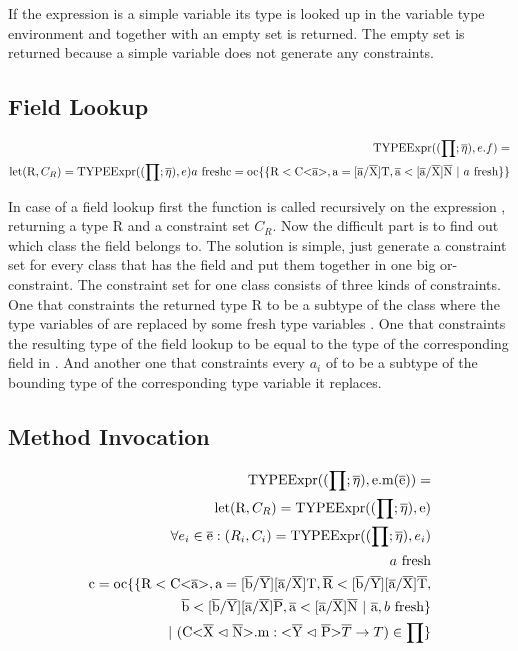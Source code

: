 If the expression is a simple variable its type is looked up in the variable type environment and together with an empty set is returned. The empty set is returned because a simple variable does not generate any constraints.

\subsection{Field Lookup}

\begin{align*}
    \texpr{e.f} = \\
    \text{let} ( \text{R}, C_R ) = \texpr{e}
    \fresh{a}
    \text{c} = \text{oc} \{ \{ \text{R} < \text{C<} \ot{a} \text{>}, \text{a} = \tsxsn{a}{X}{T}, \ot{a} < \tsxsns{a}{X}{N} \ | \ \fresh{a} \} \}\\
\end{align*}

In case of a field lookup  first the  function is called recursively on the expression , returning a
type R and a constraint set $C_R$. Now the difficult part is to find out which class the field  belongs to. The solution is simple,
just generate a constraint set for every class  that has the field  and put them together in one big or-constraint.
The constraint set for one class consists of three kinds of constraints. One that constraints the returned type R to be a subtype
of the class  where the type variables of  are replaced by some fresh type variables . One that constraints the resulting type of the field lookup
to be equal to the type of the corresponding field in . And another one that constraints every $a_i$ of  to be a subtype of the bounding type of the corresponding type variable it replaces.

\subsection{Method Invocation}

\begin{align*}
    \texpr{\text{e.m}( \ot{e} )} = \\
    \text{let} ( \text{R}, C_R ) = \texpr{\text{e}} \\
    \forall{e_i} \in \ot{e} : ( R_i, C_i ) = \texpr{e_i} \\
    \fresh{a} \\
    \text{c} = \text{oc} \{ \{ \text{R} < \text{C<} \ot{a} \text{>}, \text{a} = \tsxsnd{b}{Y}{a}{X}{T}, \ot{R} < \tsxsnsd{b}{Y}{a}{X}{T}, \\
    \ot{b} < \tsxsnsd{b}{Y}{a}{X}{P}, \ot{a} < \tsxsns{a}{X}{N} \ | \ \ot{a}, \fresh{b} \} \\
    | \ ( \cm : \yp \oto{T} ) \in \prod \}\\
\end{align*}

